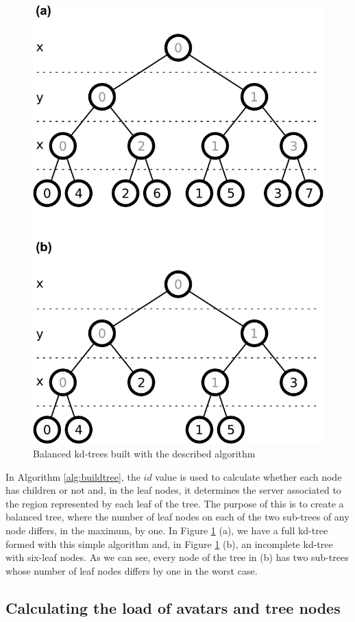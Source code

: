 \documentclass[acmtocl]{acmtrans2m}
\begin{document}
\begin{figure}[!t]
	\centering
	\includegraphics[width=0.75\linewidth]{images/kdtree}
	\caption{Balanced kd-trees built with the described algorithm}
	\label{fig:kdtree}
\end{figure}

In Algorithm \ref{alg:buildtree}, the $id$ value is used to calculate whether each node has children or not and, in the leaf nodes, it determines the server associated to the region represented by each leaf of the tree. The purpose of this is to create a balanced tree, where the number of leaf nodes on each of the two sub-trees of any node differs, in the maximum, by one. In Figure \ref{fig:kdtree} (a), we have a full kd-tree formed with this simple algorithm and, in Figure \ref{fig:kdtree} (b), an incomplete kd-tree with six-leaf nodes. As we can see, every node of the tree in (b) has two sub-trees whose number of leaf nodes differs by one in the worst case.

\subsection{Calculating the load of avatars and tree nodes}
\end{document}
